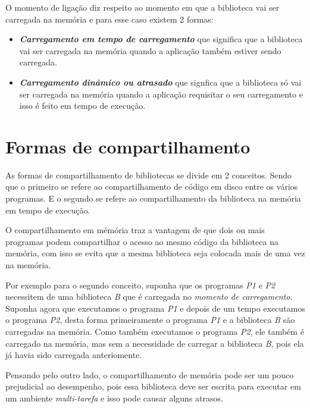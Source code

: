 O momento de ligação diz respeito ao momento em que a biblioteca vai ser carregada na memória e
para esse caso existem 2 formas:

\begin{itemize}

 \item \emph{\textbf{Carregamento em tempo de carregamento}} que significa que a biblioteca vai ser
 carregada na memória quando a aplicação também estiver sendo carregada.

 \item \emph{\textbf{Carregamento dinâmico ou atrasado}} que signfica que a biblioteca só vai ser carregada na
 memória quando a aplicação requisitar o seu carregamento e isso é feito em tempo de execução.

\end{itemize}

\section{Formas de compartilhamento}
\label{section:formas_de_compartilhamento}

As formas de compartilhamento de bibliotecas se divide em 2 conceitos. Sendo que o primeiro se refere
ao compartilhamento de código em disco entre os vários programas. E o segundo se refere ao
compartilhamento da biblioteca na memória em tempo de execução.

O compartilhamento em mémória traz a vantagem de que dois ou mais programas podem
compartilhar o acesso ao mesmo código da biblioteca na memória, com isso se evita que a mesma
biblioteca seja colocada mais de uma vez na memória.

Por exemplo para o segundo conceito, suponha que os programas \emph{P1} e \emph{P2} necessitem de
uma biblioteca \emph{B} que é carregada no \emph{momento de carregamento}. Suponha
agora que executamos o programa \emph{P1} e depois de um tempo executamos o programa \emph{P2}, desta
forma primeiramente o programa \emph{P1} e a biblioteca \emph{B} são carregadas na memória. Como
também executamos o programa \emph{P2}, ele também é carregado na memória, mas sem a necessidade de
carregar a biblioteca \emph{B}, pois ela já havia sido carregada anteriomente.

Pensando pelo outro lado, o compartilhamento de memória pode ser um pouco prejudicial
ao desempenho, pois essa biblioteca deve ser escrita para executar em um ambiente \emph{multi-tarefa}
e isso pode causar alguns atrasos.
